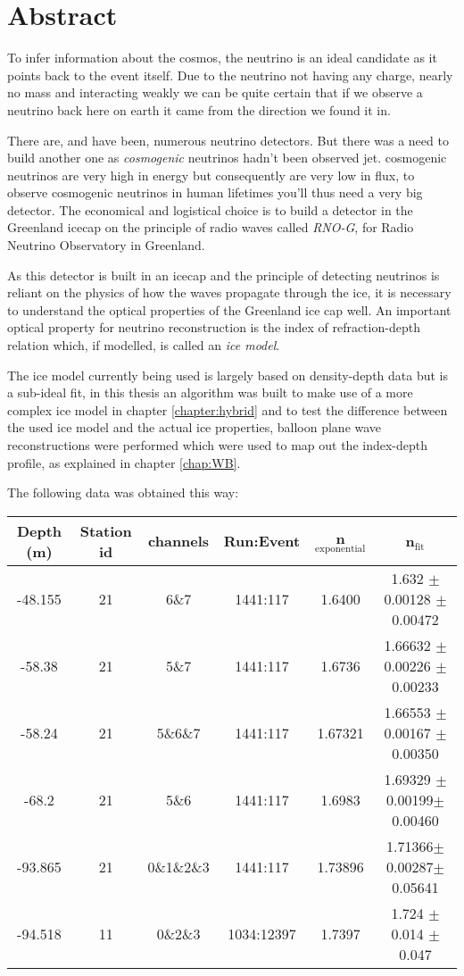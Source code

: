 \shipout\null
\newpage
\chapter*{Abstract}
To infer information about the cosmos, the neutrino is an ideal candidate as it
points back to the event itself.  Due to the neutrino not having any charge,
nearly no mass and interacting weakly we can be quite certain that if we
observe a neutrino back here on earth it came from the direction we found it in.

There are, and have been, numerous neutrino detectors. But there was a need to 
build another one as \textit{cosmogenic} neutrinos hadn't been observed jet.
cosmogenic neutrinos are very high in energy but consequently are very low in flux,
to observe cosmogenic neutrinos in human lifetimes you'll thus need a very big detector.
The economical and logistical choice is to build a detector in the Greenland icecap
on the principle of radio waves called \textit{RNO-G}, for Radio Neutrino Observatory
in Greenland.

As this detector is built in an icecap and the principle of detecting neutrinos is reliant
on the physics of how the waves propagate through the ice, it is necessary to understand 
the optical properties of the Greenland ice cap well. An important optical property
for neutrino reconstruction is the index of refraction-depth relation which, if modelled,
is called an \textit{ice model}.

The ice model currently being used is largely based on density-depth data but is 
a sub-ideal fit, in this thesis an algorithm was built to make use of a more complex
ice model in chapter \ref{chapter:hybrid} and to test the difference between the
used ice model and the actual ice properties, balloon plane wave reconstructions were
performed which were used to map out the index-depth profile, as explained in chapter \ref{chap:WB}.

The following data was obtained this way:
\begin{center}
\begin{tabular}{||c c c c c c||}
 \hline
 Depth (m) & Station id & channels & Run:Event & n$_\text{exponential}$ & n$_\text{fit}$\\ [0.5ex]
 \hline\hline
 -48.155 & 21 & 6\&7 & 1441:117 & 1.6400 & 1.632 $\pm$ 0.00128 $\pm$ 0.00472\\
 -58.38 & 21 & 5\&7 & 1441:117 & 1.6736 & 1.66632 $\pm$ 0.00226 $\pm$ 0.00233 \\
 -58.24 & 21 & 5\&6\&7 & 1441:117 & 1.67321 & 1.66553 $\pm$ 0.00167 $\pm$ 0.00350 \\
 -68.2 & 21 & 5\&6 & 1441:117 & 1.6983 & 1.69329 $\pm$0.00199$\pm$0.00460 \\
 -93.865 & 21 & 0\&1\&2\&3 & 1441:117 & 1.73896 & 1.71366$\pm$0.00287$\pm$0.05641\\
 -94.518 & 11 & 0\&2\&3 & 1034:12397 & 1.7397 & 1.724 $\pm$ 0.014 $\pm$ 0.047 \\
 \hline
\end{tabular}
\end{center}
\newpage
